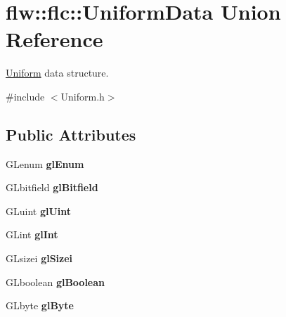 \hypertarget{unionflw_1_1flc_1_1UniformData}{}\section{flw\+:\+:flc\+:\+:Uniform\+Data Union Reference}
\label{unionflw_1_1flc_1_1UniformData}


\hyperlink{classflw_1_1flc_1_1Uniform}{Uniform} data structure.  




{\ttfamily \#include $<$Uniform.\+h$>$}

\subsection*{Public Attributes}
\begin{DoxyCompactItemize}
\item 
\mbox{\label{unionflw_1_1flc_1_1UniformData_a9b9b3f9b548115607ea61cbd069d4eef}} 
G\+Lenum {\bfseries gl\+Enum}
\item 
\mbox{\label{unionflw_1_1flc_1_1UniformData_a9da20ca9bd210cfc52a97cd87c6e505a}} 
G\+Lbitfield {\bfseries gl\+Bitfield}
\item 
\mbox{\label{unionflw_1_1flc_1_1UniformData_a6ce2e035176e55b7f4ad77e6ff12ed06}} 
G\+Luint {\bfseries gl\+Uint}
\item 
\mbox{\label{unionflw_1_1flc_1_1UniformData_a5d98d9d627f7d15bb0faa52cf73062d4}} 
G\+Lint {\bfseries gl\+Int}
\item 
\mbox{\label{unionflw_1_1flc_1_1UniformData_aac906b35676f443b689062b96b445ee9}} 
G\+Lsizei {\bfseries gl\+Sizei}
\item 
\mbox{\label{unionflw_1_1flc_1_1UniformData_a33ab81a756eebca6dd9840d4b785558a}} 
G\+Lboolean {\bfseries gl\+Boolean}
\item 
\mbox{\label{unionflw_1_1flc_1_1UniformData_a45a866dec202075c49e411415b47b8a7}} 
G\+Lbyte {\bfseries gl\+Byte}
\item 

\end{DoxyCompactItemize}
